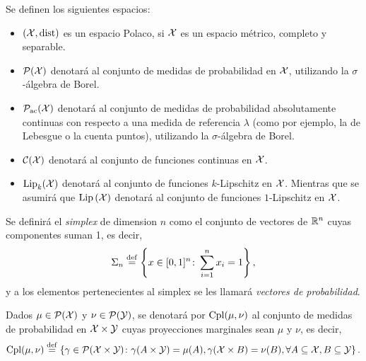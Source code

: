  {
  \begin{definition}
	  Se definen los siguientes espacios:
	  \begin{itemize}
		  \item $(\cX, \dist)$ es un espacio Polaco, si $\cX$ es un espacio métrico, completo y separable.
		  \item $\ProbSpace[\cX]$ denotará al conjunto de medidas de probabilidad en $\cX$, utilizando la $\sigma$-álgebra de Borel.
		  \item $\ProbSpaceAC[\cX]$ denotará al conjunto de medidas de probabilidad absolutamente continuas con respecto a una medida de referencia $\lambda$ (como por ejemplo, la de Lebesgue o la cuenta puntos), utilizando la $\sigma$-álgebra de Borel.
		  \item $\mathcal{C}(\cX)$ denotará al conjunto de funciones continuas en $\cX$.
		  \item ${\Lip}_{k}(\cX)$ denotará al conjunto de funciones $k$-Lipschitz en $\cX$. Mientras que se asumirá que $\Lip[\cX]$ denotará al conjunto de funciones $1$-Lipschitz en $\cX$. 
	  \end{itemize}
  \end{definition}

  \begin{definition}
	  Se definirá el \emph{simplex} de dimension $n$ como el conjunto de vectores de $\R^{n}$ cuyas componentes suman 1, es decir,
	  \begin{equation}
		  \Simplex \eqdef \left\{
		  x \in [0, 1]^{n} \colon \sum_{i=1}^{n} x_{i} = 1
		  \right\},
	  \end{equation}
	  y a los elementos pertenecientes al simplex se les llamará \emph{vectores de probabilidad}.
  \end{definition}

  \begin{definition}
	  Dados $\mu \in \ProbSpace[\cX]$ y $\nu \in \ProbSpace[\cY]$, se denotará por $\Cpl(\mu, \nu)$ al conjunto de medidas de probabilidad en $\cX \times \cY$ cuyas proyecciones marginales sean $\mu$ y $\nu$, es decir,
	  \begin{equation}
		  \Cpl(\mu, \nu) \eqdef \left\{
		  \gamma \in \ProbSpace[\cX \times \cY] \colon \gamma(A \times \cY) = \mu(A), \gamma(\cX \times B) = \nu(B), \forall A \subseteq \cX, B \subseteq \cY
		  \right\}.
	  \end{equation}
  \end{definition}

}
